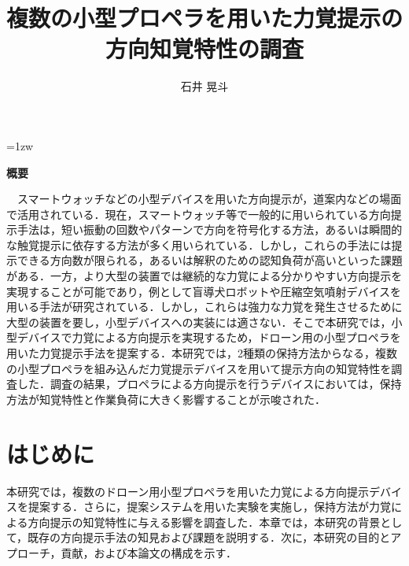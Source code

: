 \documentclass[a4paper,11pt]{jreport}
\title{複数の小型プロペラを用いた力覚提示の方向知覚特性の調査}
\author{石井 晃斗}
\begin{document}
\maketitle
\thispagestyle{empty}
\newpage

\thispagestyle{empty}
\vspace*{20pt plus 1fil}
\parindent=1zw
\noindent

\begin{center}
{\bf 概要}
\vspace{5mm}
\end{center}
　スマートウォッチなどの小型デバイスを用いた方向提示が，道案内などの場面で活用されている．現在，スマートウォッチ等で一般的に用いられている方向提示手法は，短い振動の回数やパターンで方向を符号化する方法，あるいは瞬間的な触覚提示に依存する方法が多く用いられている．しかし，これらの手法には提示できる方向数が限られる，あるいは解釈のための認知負荷が高いといった課題がある．一方，より大型の装置では継続的な力覚による分かりやすい方向提示を実現することが可能であり，例として盲導犬ロボットや圧縮空気噴射デバイスを用いる手法が研究されている．しかし，これらは強力な力覚を発生させるために大型の装置を要し，小型デバイスへの実装には適さない．そこで本研究では，小型デバイスで力覚による方向提示を実現するため，ドローン用の小型プロペラを用いた力覚提示手法を提案する．本研究では，2種類の保持方法からなる，複数の小型プロペラを組み込んだ力覚提示デバイスを用いて提示方向の知覚特性を調査した．調査の結果，プロペラによる方向提示を行うデバイスにおいては，保持方法が知覚特性と作業負荷に大きく影響することが示唆された．

\par
\vspace{0pt plus 1fil}
\newpage

\tableofcontents
\listoffigures
\listoftables

\pagebreak \setcounter{page}{1}

\chapter{はじめに}
本研究では，複数のドローン用小型プロペラを用いた力覚による方向提示デバイスを提案する．さらに，提案システムを用いた実験を実施し，保持方法が力覚による方向提示の知覚特性に与える影響を調査した．本章では，本研究の背景として，既存の方向提示手法の知見および課題を説明する．次に，本研究の目的とアプローチ，貢献，および本論文の構成を示す．
\end{document}
